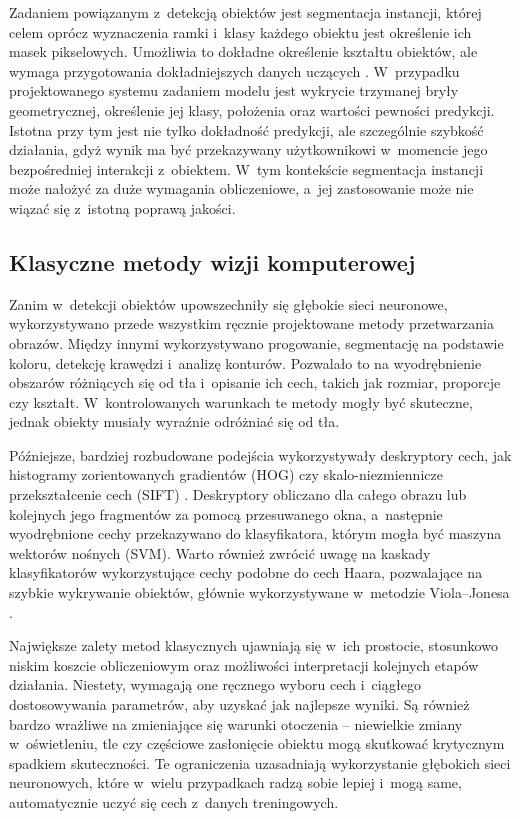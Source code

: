Zadaniem powiązanym z~detekcją obiektów jest segmentacja instancji, której celem oprócz wyznaczenia ramki i~klasy każdego obiektu jest określenie ich masek pikselowych. Umożliwia to dokładne określenie kształtu obiektów, ale wymaga przygotowania dokładniejszych danych uczących \cite{bib:he2018maskrcnn}. W~przypadku projektowanego systemu zadaniem modelu jest wykrycie trzymanej bryły geometrycznej, określenie jej klasy, położenia oraz wartości pewności predykcji. Istotna przy tym jest nie tylko dokładność predykcji, ale szczególnie szybkość działania, gdyż wynik ma być przekazywany użytkownikowi w~momencie jego bezpośredniej interakcji z~obiektem. W~tym kontekście segmentacja instancji może nałożyć za duże wymagania obliczeniowe, a~jej zastosowanie może nie wiązać się z~istotną poprawą jakości.

\subsection{Klasyczne metody wizji komputerowej}

Zanim w~detekcji obiektów upowszechniły się głębokie sieci neuronowe, wykorzystywano przede wszystkim ręcznie projektowane metody przetwarzania obrazów. Między innymi wykorzystywano progowanie, segmentację na podstawie koloru, detekcję krawędzi i~analizę konturów. Pozwalało to na wyodrębnienie obszarów różniących się od tła i~opisanie ich cech, takich jak rozmiar, proporcje czy kształt. W~kontrolowanych warunkach te metody mogły być skuteczne, jednak obiekty musiały wyraźnie odróżniać się od tła.

Późniejsze, bardziej rozbudowane podejścia wykorzystywały deskryptory cech, jak histogramy zorientowanych gradientów (HOG) czy skalo-niezmiennicze przekształcenie cech (SIFT) \cite{bib:lowe2004distinctive, bib:dalal2005histograms}. Deskryptory obliczano dla całego obrazu lub kolejnych jego fragmentów za pomocą przesuwanego okna, a~następnie wyodrębnione cechy przekazywano do klasyfikatora, którym mogła być maszyna wektorów nośnych (SVM). Warto również zwrócić uwagę na kaskady klasyfikatorów wykorzystujące cechy podobne do cech Haara, pozwalające na szybkie wykrywanie obiektów, głównie wykorzystywane w~metodzie Viola--Jonesa \cite{bib:viola2001rapidobjectdetection}.

Największe zalety metod klasycznych ujawniają się w~ich prostocie, stosunkowo niskim koszcie obliczeniowym oraz możliwości interpretacji kolejnych etapów działania. Niestety, wymagają one ręcznego wyboru cech i~ciągłego dostosowywania parametrów, aby uzyskać jak najlepsze wyniki. Są również bardzo wrażliwe na zmieniające się warunki otoczenia -- niewielkie zmiany w~oświetleniu, tle czy częściowe zasłonięcie obiektu mogą skutkować krytycznym spadkiem skuteczności. Te ograniczenia uzasadniają wykorzystanie głębokich sieci neuronowych, które w~wielu przypadkach radzą sobie lepiej i~mogą same, automatycznie uczyć się cech z~danych treningowych.

